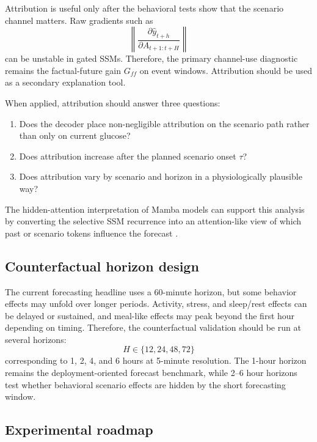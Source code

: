 Attribution is useful only after the behavioral tests show that the scenario channel matters. Raw gradients such as
\begin{equation}
    \left\|\frac{\partial \hat{y}_{t+h}}{\partial A_{t+1:t+H}}\right\|
\end{equation}
can be unstable in gated SSMs. Therefore, the primary channel-use diagnostic remains the factual-future gain $G_{ff}$ on event windows. Attribution should be used as a secondary explanation tool.

When applied, attribution should answer three questions:
\begin{enumerate}
    \item Does the decoder place non-negligible attribution on the scenario path rather than only on current glucose?
    \item Does attribution increase after the planned scenario onset $\tau$?
    \item Does attribution vary by scenario and horizon in a physiologically plausible way?
\end{enumerate}
The hidden-attention interpretation of Mamba models can support this analysis by converting the selective SSM recurrence into an attention-like view of which past or scenario tokens influence the forecast \citep{ali2024hidden}.

\subsection{Counterfactual horizon design}
\label{subsec:horizon_design}

The current forecasting headline uses a 60-minute horizon, but some behavior effects may unfold over longer periods. Activity, stress, and sleep/rest effects can be delayed or sustained, and meal-like effects may peak beyond the first hour depending on timing. Therefore, the counterfactual validation should be run at several horizons:
\begin{equation}
    H \in \{12,24,48,72\}
\end{equation}
corresponding to 1, 2, 4, and 6 hours at 5-minute resolution. The 1-hour horizon remains the deployment-oriented forecast benchmark, while 2--6 hour horizons test whether behavioral scenario effects are hidden by the short forecasting window.

\subsection{Experimental roadmap}
\label{subsec:cf_experimental_roadmap}

